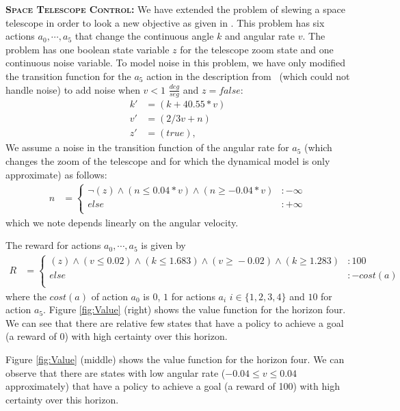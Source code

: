 {\bf \textsc{Space Telescope Control}:} We have extended the problem
of slewing a space telescope in order to look a new objective as given
in \cite{DLohr:2012}. This problem has six actions $a_0, \cdots ,a_5$
that change the continuous angle $k$ and angular rate $v$.  The
problem has one boolean state variable $z$ for the telescope zoom
state and one continuous noise variable.  To model noise in this
problem, we have only modified the transition function for the $a_5$
action in the description from~\cite{DLohr:2012} (which could not
handle noise) to add noise when $v < 1$ $\frac{deg}{seg}$ and
$z=false$: {\footnotesize
\begin{align*}
k' & =( k + 40.55*v) \\
v'& =(2/3 v + n) \\
z'& =( true ),
\end{align*}}
We assume a noise in the transition function of the angular
rate for $a_5$ (which changes the zoom of the telescope and for which
the dynamical model is only approximate) as follows:
{\footnotesize
\begin{align*}
n & = \begin{cases}
\neg (z) \wedge (n \leq 0.04*v) \wedge (n \geq -0.04*v) &:-\infty\\
else &: +\infty\\
\end{cases}
\end{align*}}
which we note depends linearly on the angular velocity.

The reward for actions $a_0, \cdots ,a_5$ is given by
{\tiny
\begin{align*}
R & = \begin{cases}
(z) \wedge (v \! \leq \! 0.02) \wedge (k \! \leq \! 1.683) \wedge (v \! \geq \! -0.02) \wedge (k \! \geq \! 1.283) &\!\!:100\\
else &: -\mathit{cost}(a)\\
\end{cases}
\end{align*}}
where the $\mathit{cost}(a)$ of action $a_0$ is 0, $1$ for actions
$a_i$ $i \in \{1,2,3,4\}$ and $10$ for action $a_5$.  Figure
\ref{fig:Value} (right) shows the value function for the horizon
four. We can see that there are relative few states that have a policy
to achieve a goal (a reward of 0) with high certainty over this
horizon.

Figure \ref{fig:Value} (middle) shows the value function for the
horizon four. We can observe that there are states with low angular
rate ($-0.04\leq v \leq 0.04$ approximately) that have a policy to
achieve a goal (a reward of 100) with high certainty over this
horizon.

